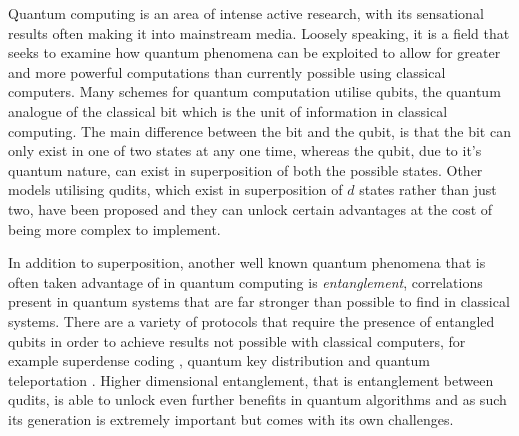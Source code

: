 Quantum computing is an area of intense active research, with its sensational results often making it into mainstream media.
Loosely speaking, it is a field that seeks to examine how quantum phenomena can be exploited to allow for greater and more powerful computations than currently possible using classical computers.
Many schemes for quantum computation utilise qubits, the quantum analogue of the classical bit which is the unit of information in classical computing.
The main difference between the bit and the qubit, is that the bit can only exist in one of two states at any one time, whereas the qubit, due to it's quantum nature, can exist in superposition of both the possible states.
Other models utilising qudits, which exist in superposition of $d$ states rather than just two, have been proposed and they can unlock certain advantages at the cost of being more complex to implement.

In addition to superposition, another well known quantum phenomena that is often taken advantage of in quantum computing is \emph{entanglement}, correlations present in quantum systems that are far stronger than possible to find in classical systems.
There are a variety of protocols that require the presence of entangled qubits in order to achieve results not possible with classical computers, for example superdense coding \cite{Superdense}, quantum key distribution \cite{qkd} and quantum teleportation \cite{qteleport}.
Higher dimensional entanglement, that is entanglement between qudits, is able to unlock even further benefits in quantum algorithms and as such its generation is extremely important but comes with its own challenges. \paragraph{}


